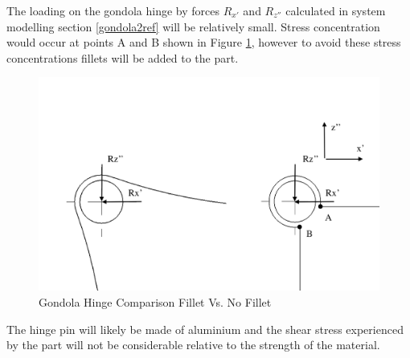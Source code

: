 \documentclass[../main.tex]{subfiles}
\begin{document}
The loading on the gondola hinge by forces $R_{x'}$ and $R_{z''}$ calculated in system modelling section \ref{gondola2ref} will be relatively small. Stress concentration would occur at points A and B shown in Figure \ref{fig:fillethinge}, however to avoid these stress concentrations fillets will be added to the part. 

\begin{figure}[H]
	\centering
	\includegraphics[width=1\textwidth]{img/gondola/filletHinge.PNG}
	\caption{Gondola Hinge Comparison Fillet Vs. No Fillet}
	\label{fig:fillethinge}
\end{figure}

The hinge pin will likely be made of aluminium and the shear stress experienced by the part will not be considerable relative to the strength of the material. 
\end{document}
